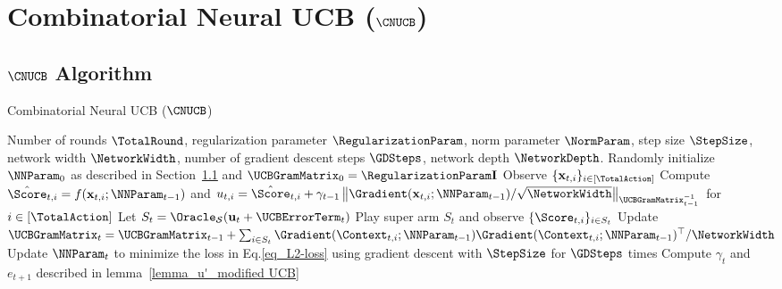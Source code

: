 \documentclass{article}
\theoremstyle{plain}
\begin{document}
\section{Combinatorial Neural UCB ($\CNUCB$)} \label{sec:CN-UCB}

\subsection{$\CNUCB$ Algorithm} \label{subsec:CN-UCB}

\begin{algorithm*}[t!]
   \caption{Combinatorial Neural UCB ($\CNUCB$)}
   \label{alg:CN-UCB}
\begin{algorithmic}
     Number of rounds $\TotalRound$, regularization parameter $\RegularizationParam$, norm parameter $\NormParam$, step size $\StepSize$, network width $\NetworkWidth$, number of gradient descent steps $\GDSteps$, network depth $\NetworkDepth$.
     Randomly initialize $\NNParam_0$ as described in Section~\ref{subsec:CN-UCB} and $\UCBGramMatrix_0 = \RegularizationParam \mathbf{I}$
    \STATE Observe $\{ \mathbf{x}_{t,i} \}_{i \in [\TotalAction]}$
    \STATE Compute $\hat{\Score}_{t,i} = f(\mathbf{x}_{t,i}; \NNParam_{t-1})$ and 
    $u_{t,i} = \hat{\Score}_{t,i} + \gamma_{t-1} \left\| \Gradient(\mathbf{x}_{t,i}; \NNParam_{t-1}) / \sqrt{\NetworkWidth} \right\|_{\UCBGramMatrix_{t-1}^{-1}}$ for $i \in [\TotalAction]$
    \STATE Let $S_t = \Oracle_{\mathcal{S}} (\mathbf{u}_t + \mathbf{\UCBErrorTerm}_t)$ 
    \STATE Play super arm $S_t$ and observe $\{ \Score_{t, i} \}_{i \in S_t}$
    \STATE Update $\UCBGramMatrix_{t} = \UCBGramMatrix_{t-1} + \sum_{i \in S_t} \Gradient(\Context_{t,i}; \NNParam_{t-1})  \Gradient(\Context_{t,i}; \NNParam_{t-1})^\top / \NetworkWidth$
    \STATE Update $\NNParam_{t}$ to minimize the loss in Eq.\eqref{eq_L2-loss} using gradient descent with $\StepSize$ for $\GDSteps$ times
    \STATE Compute $\gamma_t$ and $e_{t+1}$ described in lemma~\ref{lemma_u'_modified UCB} 
  \ENDFOR
\end{algorithmic}
\end{algorithm*}
\end{document}
